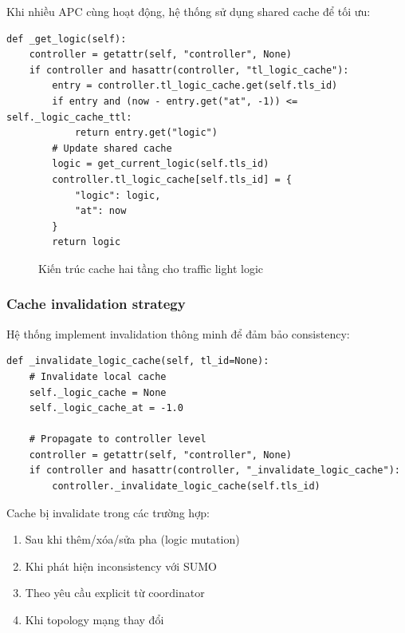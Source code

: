 Khi nhiều APC cùng hoạt động, hệ thống sử dụng shared cache để tối ưu:

\begin{lstlisting}[style=py, caption={Shared cache mechanism}]
def _get_logic(self):
    controller = getattr(self, "controller", None)
    if controller and hasattr(controller, "tl_logic_cache"):
        entry = controller.tl_logic_cache.get(self.tls_id)
        if entry and (now - entry.get("at", -1)) <= self._logic_cache_ttl:
            return entry.get("logic")
        # Update shared cache
        logic = get_current_logic(self.tls_id)
        controller.tl_logic_cache[self.tls_id] = {
            "logic": logic, 
            "at": now
        }
        return logic
\end{lstlisting}

\begin{figure}[H]
    \centering
    \caption{Kiến trúc cache hai tầng cho traffic light logic}
    \label{fig:cache_architecture}
\end{figure}

\subsubsection{Cache invalidation strategy}

Hệ thống implement invalidation thông minh để đảm bảo consistency:

\begin{lstlisting}[style=py, caption={Cache invalidation mechanism}]
def _invalidate_logic_cache(self, tl_id=None):
    # Invalidate local cache
    self._logic_cache = None
    self._logic_cache_at = -1.0
    
    # Propagate to controller level
    controller = getattr(self, "controller", None)
    if controller and hasattr(controller, "_invalidate_logic_cache"):
        controller._invalidate_logic_cache(self.tls_id)
\end{lstlisting}

Cache bị invalidate trong các trường hợp:
\begin{enumerate}
    \item Sau khi thêm/xóa/sửa pha (logic mutation)
    \item Khi phát hiện inconsistency với SUMO
    \item Theo yêu cầu explicit từ coordinator
    \item Khi topology mạng thay đổi
\end{enumerate}


